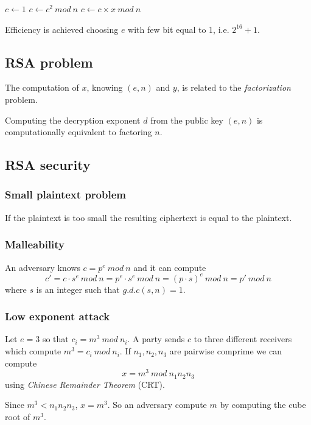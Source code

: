 \documentclass[a4paper,12pt]{article}
\begin{document}
\begin{algorithm}[H]
\begin{algorithmic}
\State $c \gets 1$
	\State $c \gets c^2\ mod\ n$
	 \State $c \gets c \times x\ mod\ n$ \EndIf

\EndFor
\end{algorithmic}
\end{algorithm}


Efficiency is achieved choosing $e$ with few bit equal to 1, i.e. $2^{16} + 1$.

\subsection{RSA problem}
The computation of $x$, knowing $(e,n)$ and $y$, is related to the \textit{factorization} problem.

Computing the decryption exponent $d$ from the public key $(e, n)$ is computationally equivalent to factoring $n$.

\subsection{RSA security}
\subsubsection{Small plaintext problem}
If the plaintext is too small the resulting ciphertext is equal to the plaintext.

\subsubsection{Malleability}
An adversary knows $c = p^e\ mod\ n$ and it can compute
$$ c' = c \cdot s^e\ mod\ n = p^e \cdot s^e\ mod\ n = (p \cdot s)^e\ mod\ n = p'\ mod\ n $$
where $s$ is an integer such that $g.d.c(s, n) = 1$.

\subsubsection{Low exponent attack}
Let $e = 3$ so that $c_i = m^3\ mod\ n_i$.
A party sends $c$ to three different receivers which compute $m^3 = c_i\ mod\ n_i$.
If $n_1, n_2, n_3$ are pairwise comprime we can compute 
$$ x = m^3\ mod\ n_1n_2n_3$$ 
using \textit{Chinese Remainder Theorem} (CRT).

Since $m^3 < n_1n_2n_3$, $x = m^3$. So an adversary compute $m$ by computing the cube root of $m^3$.
\end{document}
